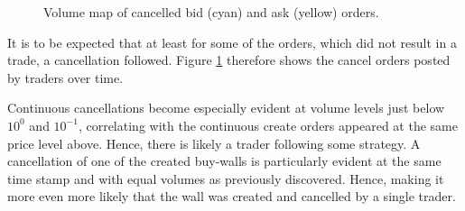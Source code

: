 \begin{figure}[H]
    \centering
    \caption{Volume map of cancelled bid (cyan) and ask (yellow) orders.}
    \label{fig:data-volmap-cancelled}
\end{figure}

It is to be expected that at least for some of the orders, which did not result in a trade, a cancellation followed.
Figure \ref{fig:data-volmap-cancelled} therefore shows the cancel orders posted by traders over time.

Continuous cancellations become especially evident at volume levels just below $10^0$ and $10^{-1}$, correlating with the continuous create orders appeared at the same price level above.
Hence, there is likely a trader following some strategy.
A cancellation of one of the created buy-walls is particularly evident at the same time stamp and with equal volumes as previously discovered.
Hence, making it more even more likely that the wall was created and cancelled by a single trader.
\vfill
\pagebreak

